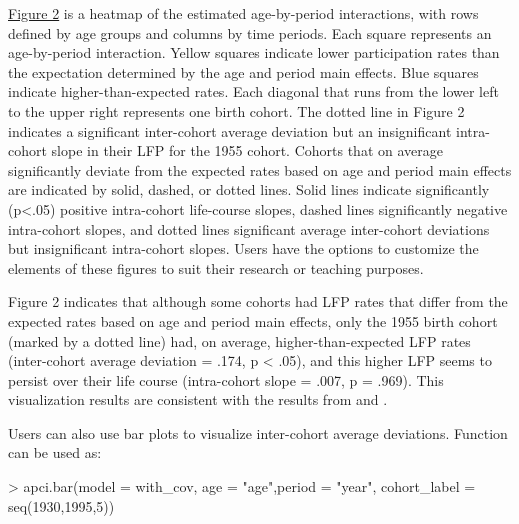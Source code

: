 \hyperref[figure:2]{Figure 2} is a heatmap of the estimated age-by-period interactions, with rows defined by age groups and columns by time periods. Each square represents an age-by-period interaction. Yellow squares indicate lower participation rates than the expectation determined by the age and period main effects. Blue squares indicate higher-than-expected rates. Each diagonal that runs from the lower left to the upper right represents one birth cohort. The dotted line in Figure 2 indicates a significant inter-cohort average deviation but an insignificant intra-cohort slope in their LFP for the 1955 cohort. Cohorts that on average significantly deviate from the expected rates based on age and period main effects are indicated by solid, dashed, or dotted lines. Solid lines indicate significantly (p<.05) positive intra-cohort life-course slopes, dashed lines significantly negative intra-cohort slopes, and dotted lines significant average inter-cohort deviations but insignificant intra-cohort slopes. Users have the options to customize the elements of these figures to suit their research or teaching purposes.

Figure 2 indicates that although some cohorts had LFP rates that differ from the expected rates based on age and period main effects, only the 1955 birth cohort (marked by a dotted line) had, on average, higher-than-expected LFP rates (inter-cohort average deviation = .174, p < .05), and this higher LFP seems to persist over their life course (intra-cohort slope = .007, p = .969). This visualization results are consistent with the results from  and .

Users can also use bar plots to visualize inter-cohort average deviations. Function {} can be used as:
\begin{example}
> apci.bar(model = with_cov, age = "age",period = "year", 
            cohort_label = seq(1930,1995,5))
\end{example}

